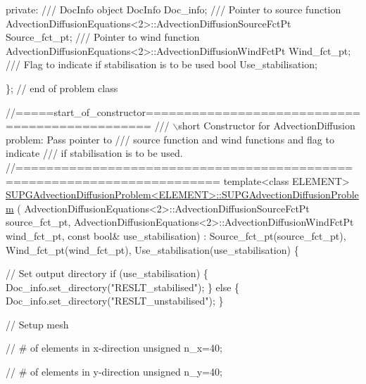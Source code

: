 \begin{DoxyCodeInclude}
\textcolor{keyword}{private}:
\textcolor{comment}{}
\textcolor{comment}{ /// DocInfo object}
\textcolor{comment}{} DocInfo Doc\_info;
\textcolor{comment}{}
\textcolor{comment}{ /// Pointer to source function}
\textcolor{comment}{} AdvectionDiffusionEquations<2>::AdvectionDiffusionSourceFctPt Source\_fct\_pt;
\textcolor{comment}{}
\textcolor{comment}{ /// Pointer to wind function}
\textcolor{comment}{} AdvectionDiffusionEquations<2>::AdvectionDiffusionWindFctPt Wind\_fct\_pt;
\textcolor{comment}{}
\textcolor{comment}{ /// Flag to indicate if stabilisation is to be used}
\textcolor{comment}{} \textcolor{keywordtype}{bool} Use\_stabilisation;

\}; \textcolor{comment}{// end of problem class}



\textcolor{comment}{//=====start\_of\_constructor===============================================}\textcolor{comment}{}
\textcolor{comment}{/// \(\backslash\)short Constructor for AdvectionDiffusion problem: Pass pointer to }
\textcolor{comment}{/// source function and wind functions and flag to indicate }
\textcolor{comment}{/// if stabilisation is to be used.}
\textcolor{comment}{}\textcolor{comment}{//========================================================================}
\textcolor{keyword}{template}<\textcolor{keyword}{class} ELEMENT>
\hyperlink{classSUPGAdvectionDiffusionProblem_a95aa4192c1b42327b12cdbb75295d192}{SUPGAdvectionDiffusionProblem<ELEMENT>::SUPGAdvectionDiffusionProblem}
      (
 AdvectionDiffusionEquations<2>::AdvectionDiffusionSourceFctPt source\_fct\_pt,
 AdvectionDiffusionEquations<2>::AdvectionDiffusionWindFctPt wind\_fct\_pt,
 \textcolor{keyword}{const} \textcolor{keywordtype}{bool}& use\_stabilisation)
 :  Source\_fct\_pt(source\_fct\_pt), Wind\_fct\_pt(wind\_fct\_pt), 
    Use\_stabilisation(use\_stabilisation)
\{ 

 \textcolor{comment}{// Set output directory}
 \textcolor{keywordflow}{if} (use\_stabilisation)
  \{
   Doc\_info.set\_directory(\textcolor{stringliteral}{"RESLT\_stabilised"});
  \}
 \textcolor{keywordflow}{else}
  \{
   Doc\_info.set\_directory(\textcolor{stringliteral}{"RESLT\_unstabilised"});
  \}

 \textcolor{comment}{// Setup mesh}

 \textcolor{comment}{// # of elements in x-direction}
 \textcolor{keywordtype}{unsigned} n\_x=40;

 \textcolor{comment}{// # of elements in y-direction}
 \textcolor{keywordtype}{unsigned} n\_y=40;


\end{DoxyCodeInclude}
